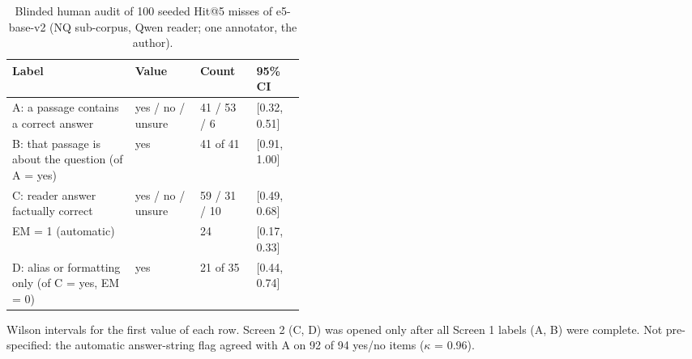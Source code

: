 \begin{table}[t]
\centering
\footnotesize
\caption{Blinded human audit of 100 seeded Hit@5 misses of e5-base-v2 (NQ sub-corpus, Qwen reader; one annotator, the author).}
\label{tab:humanaudit}
\begin{tabular}{p{0.42\linewidth}lll}
\toprule
Label & Value & Count & 95\% CI \\
\midrule
A: a passage contains a correct answer & yes / no / unsure & 41 / 53 / 6 & [0.32, 0.51] \\
B: that passage is about the question (of A = yes) & yes & 41 of 41 & [0.91, 1.00] \\
C: reader answer factually correct & yes / no / unsure & 59 / 31 / 10 & [0.49, 0.68] \\
\quad EM = 1 (automatic) & & 24 & [0.17, 0.33] \\
D: alias or formatting only (of C = yes, EM = 0) & yes & 21 of 35 & [0.44, 0.74] \\
\bottomrule
\end{tabular}
\par\smallskip\parbox{\linewidth}{\footnotesize Wilson intervals for the first value of each row. Screen 2 (C, D) was opened only after all Screen 1 labels (A, B) were complete. Not pre-specified: the automatic answer-string flag agreed with A on 92 of 94 yes/no items ($\kappa$ = 0.96).}
\end{table}
